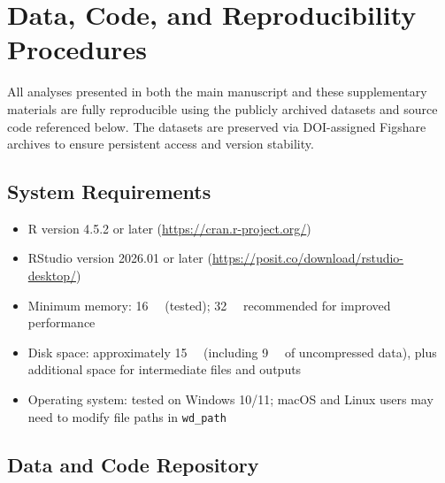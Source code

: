 \documentclass[linenumber]{jdsart}
\begin{document}

\section{Data, Code, and Reproducibility Procedures}
\label{sec:reproducibility}



All analyses presented in both the main manuscript and these supplementary
materials are fully reproducible using the publicly archived datasets and
source code referenced below. The datasets are preserved via DOI-assigned
Figshare archives to ensure persistent access and version stability.


\subsection*{System Requirements}

\begin{itemize}
  \item R \citep{R2025} version 4.5.2 or later (\url{https://cran.r-project.org/})
  \item RStudio version 2026.01 or later (\url{https://posit.co/download/rstudio-desktop/})
  \item Minimum memory: \SI{16}{\giga\byte} (tested); \SI{32}{\giga\byte} recommended for improved performance
  \item Disk space: approximately \SI{15}{\giga\byte} (including \SI{9}{\giga\byte} of uncompressed data), plus additional space for intermediate files and outputs
  \item Operating system: tested on Windows 10/11; macOS and Linux users may need to modify file paths in \texttt{wd\_path}
\end{itemize}



\subsection*{Data and Code Repository}
\end{document}
